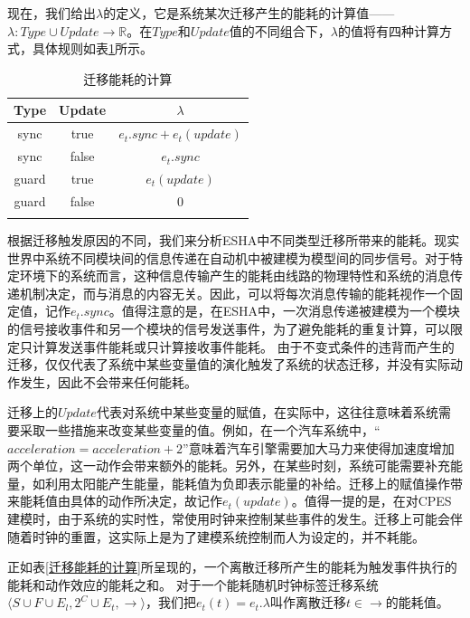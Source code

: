 	现在，我们给出$\lambda$的定义，它是系统某次迁移产生的能耗的计算值—— $\lambda:Type \cup Update\rightarrow\mathbb{R}$。在$Type$和$Update$值的不同组合下，$\lambda$的值将有四种计算方式，具体规则如表\ref{energy-transition}所示。

	\begin{table}[!t]
	\renewcommand{\arraystretch}{1.4}
	\caption{迁移能耗的计算}
	\label{迁移能耗的计算}
	\centering
	\begin{tabular}{c c c}
	\hline
	Type & Update & $\lambda$ \\
	\hline
	sync & true & $e_{t}.sync + e_{t}(update)$\\
	sync & false & $e_{t}.sync$\\
	guard & true & $e_{t}(update)$\\
	guard & false & $0$\\
	\hline
	\label{energy-transition}
	\end{tabular}
	\end{table}
 
	根据迁移触发原因的不同，我们来分析ESHA中不同类型迁移所带来的能耗。现实世界中系统不同模块间的信息传递在自动机中被建模为模型间的同步信号。对于特定环境下的系统而言，这种信息传输产生的能耗由线路的物理特性和系统的消息传递机制决定，而与消息的内容无关。因此，可以将每次消息传输的能耗视作一个固定值，记作$e_{t}.sync$。值得注意的是，在ESHA中，一次消息传递被建模为一个模块的信号接收事件和另一个模块的信号发送事件，为了避免能耗的重复计算，可以限定只计算发送事件能耗或只计算接收事件能耗。
	由于不变式条件的违背而产生的迁移，仅仅代表了系统中某些变量值的演化触发了系统的状态迁移，并没有实际动作发生，因此不会带来任何能耗。

	迁移上的$Update$代表对系统中某些变量的赋值，在实际中，这往往意味着系统需要采取一些措施来改变某些变量的值。例如，在一个汽车系统中，``$acceleration =  acceleration +2$''意味着汽车引擎需要加大马力来使得加速度增加两个单位，这一动作会带来额外的能耗。另外，在某些时刻，系统可能需要补充能量，如利用太阳能产生能量，能耗值为负即表示能量的补给。迁移上的赋值操作带来能耗值由具体的动作所决定，故记作$e_{t}(update)$。值得一提的是，在对CPES建模时，由于系统的实时性，常使用时钟来控制某些事件的发生。迁移上可能会伴随着时钟的重置，这实际上是为了建模系统控制而人为设定的，并不耗能。
	
	正如表\ref{迁移能耗的计算}所呈现的，一个离散迁移所产生的能耗为触发事件执行的能耗和动作效应的能耗之和。 对于一个能耗随机时钟标签迁移系统 $\langle S \cup F \cup E_l, 2^{C} \cup E_t, \longrightarrow\rangle$，我们把$e_{t}(t)=e_{t}.\lambda$叫作离散迁移$t \in \longrightarrow$的能耗值。  

